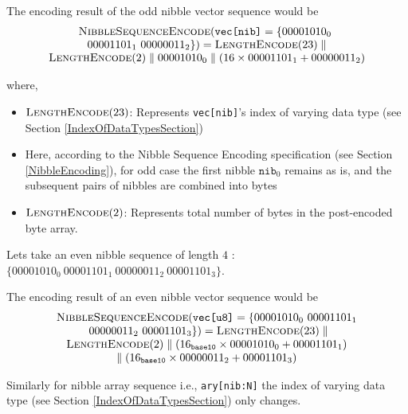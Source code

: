 \documentclass[../alan-handbook.tex]{subfiles}
\begin{document}
The encoding result of the odd nibble vector sequence would be 
$$
\begin{matrix}
    \Call{NibbleSequenceEncode}{\texttt{vec[nib]}= \{00001010_0 \ \\
    00001101_1 \ 00000011_2\} } = \Call{LengthEncode}{23} \parallel \\
    \Call{LengthEncode}{2} \parallel 00001010_0 \parallel (16 \times 00001101_1 + 00000011_2)
\end{matrix}
$$

where,
\begin{itemize}
    \item $\Call{LengthEncode}{23}$: Represents \texttt{vec[nib]}'s index of varying data type (see Section \ref{IndexOfDataTypesSection})
    \item Here, according to the Nibble Sequence Encoding specification (see Section \ref{NibbleEncoding}), for odd case the first nibble $\texttt{nib}_0$ remains as is, and the subsequent pairs of nibbles are combined into bytes
    \item $\Call{LengthEncode}{2}$: Represents total number of bytes in the post-encoded byte array.
\end{itemize}

Lets take an even nibble sequence of length $4$ : $\{00001010_0 \ 00001101_1 \ 00000011_2 \ 00001101_3\}$. 

The encoding result of an even nibble vector sequence would be 
$$
\begin{matrix}
    \Call{NibbleSequenceEncode}{\texttt{vec[u8]}= \{00001010_0 \ 00001101_1 \\ 
    \ 00000011_2 \ 00001101_3\}} = \Call{LengthEncode}{23} \parallel \\
    \Call{LengthEncode}{2} \parallel (16_{\texttt{base10}} \times 00001010_0 + 00001101_1) \\
    \parallel (16_{\texttt{base10}} \times 00000011_2 + 00001101_3)
\end{matrix}
$$

Similarly for nibble array sequence i.e., \texttt{ary[nib:N]} the index of varying data type (see Section \ref{IndexOfDataTypesSection}) only changes.
\end{document}
